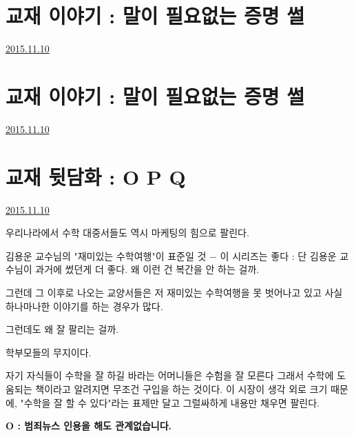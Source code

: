 \section{교재 이야기 : 말이 필요없는 증명 썰}
\href{https://www.kockoc.com/Apoc/472719}{2015.11.10}

\vspace{5mm}






\section{교재 이야기 : 말이 필요없는 증명 썰}
\href{https://www.kockoc.com/Apoc/472719}{2015.11.10}

\vspace{5mm}






\section{교재 뒷담화 : O P Q}
\href{https://www.kockoc.com/Apoc/472974}{2015.11.10}

\vspace{5mm}

우리나라에서 수학 대중서들도 역시 마케팅의 힘으로 팔린다.
\vspace{5mm}

김용운 교수님의 "재미있는 수학여행"이 표준일 것 $-$ 이 시리즈는 좋다 : 단 김용운 교수님이 과거에 썼던게 더 좋다.
왜 이런 건 복간을 안 하는 걸까.
\vspace{5mm}

그런데 그 이후로 나오는 교양서들은 저 재미있는 수학여행을 못 벗어나고 있고
사실 하나마나한 이야기를 하는 경우가 많다.
\vspace{5mm}

그런데도 왜 잘 팔리는 걸까.
\vspace{5mm}

학부모들의 무지이다.
\vspace{5mm}

자기 자식들이 수학을 잘 하길 바라는 어머니들은 수험을 잘 모른다
그래서 수학에 도움되는 책이라고 알려지면 무조건 구입을 하는 것이다.
이 시장이 생각 외로 크기 때문에, "수학을 잘 할 수 있다"라는 표제만 달고 그럴싸하게 내용만 채우면 팔린다.
\vspace{5mm}

\textbf{O : 범죄뉴스 인용을 해도 관계없습니다.}
\vspace{5mm}

